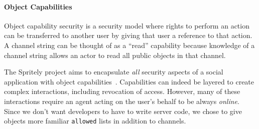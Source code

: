 \paragraph{Object Capabilities}

Object capability security is a security model where rights to perform an action
can be transferred to another user by giving that user a reference to that action.
A channel string can be thought of as a ``read'' capability because knowledge
of a channel string allows an actor to read all public objects in that channel.

The Spritely project aims to encapsulate \emph{all}
security aspects of a social application with object capabilities~\cite{spritely}.
Capabilities can indeed be layered to create complex interactions,
including revocation of access.
However, many of these interactions require an agent acting on the user's behalf
to be always \emph{online}.
Since we don't want developers to have to write server code,
we chose to give objects more familiar \texttt{allowed} lists
in addition to channels.





